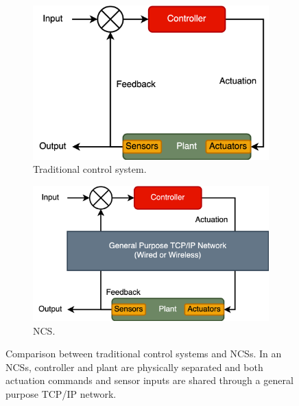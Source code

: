 \begin{figure}
    \centering
    \begin{subfigure}[t]{0.45\textwidth}
        \centering
        \includegraphics[width=\textwidth]{Figs/control_system}
        \caption{%
            Traditional control system.
        }
    \end{subfigure}%
    \hfill%
    \begin{subfigure}[t]{0.50\textwidth}
        \centering
        \includegraphics[width=\textwidth]{Figs/networked_control_system}
        \caption{%
            \acl{NCS}.
        }
    \end{subfigure}
    \caption{%
        Comparison between traditional control systems and \aclp{NCS}.
        In an \aclp{NCS}, controller and plant are physically separated and both actuation commands and sensor inputs are shared through a general purpose \acs{TCP}/\acs{IP} network.
    }\label{fig:csvsncs}
\end{figure}


